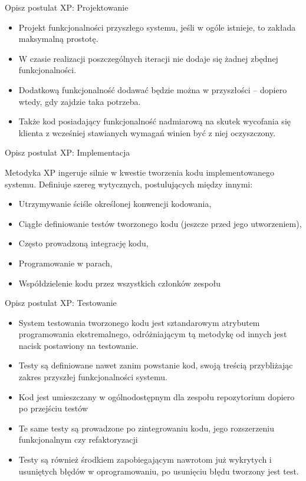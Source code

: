 \documentclass[a4paper,15pt]{article}
\begin{document}
\begin{framed}
Opisz postulat XP: Projektowanie
\end{framed}
\begin{itemize}
\item Projekt funkcjonalności przyszłego systemu, jeśli w ogóle istnieje, to zakłada maksymalną prostotę. 
\item W czasie realizacji poszczególnych iteracji nie dodaje się żadnej zbędnej funkcjonalności.
\item Dodatkową funkcjonalność dodawać będzie można w przyszłości – dopiero wtedy, gdy zajdzie taka potrzeba.
\item Także kod posiadający funkcjonalność nadmiarową na skutek wycofania się klienta z wcześniej stawianych wymagań winien być z niej oczyszczony.
\end{itemize}


\begin{framed}
Opisz postulat XP: Implementacja
\end{framed}
Metodyka XP ingeruje silnie w kwestie tworzenia kodu implementowanego systemu. Definiuje szereg wytycznych, postulujących między innymi:
\begin{itemize}
\item Utrzymywanie ściśle określonej konwencji kodowania, 
\item Ciągłe definiowanie testów tworzonego kodu (jeszcze przed jego utworzeniem),
\item Często prowadzoną integrację kodu,
\item Programowanie w parach, 
\item Współdzielenie kodu przez wszystkich członków zespołu
\end{itemize}


\begin{framed}
Opisz postulat XP: Testowanie
\end{framed}
\begin{itemize}
\item System  testowania  tworzonego  kodu  jest  sztandarowym atrybutem  programowania  ekstremalnego,  odróżniającym  tą metodykę od innych jest nacisk postawiony na testowanie. 
\item Testy są definiowane nawet zanim powstanie kod, swoją treścią przybliżając zakres przyszłej funkcjonalności systemu. 
\item Kod  jest  umieszczany  w  ogólnodostępnym  dla  zespołu repozytorium dopiero po przejściu testów
\item Te  same  testy  są  prowadzone  po  zintegrowaniu  kodu,  jego rozszerzeniu funkcjonalnym czy refaktoryzacji
\item Testy  są  również  środkiem  zapobiegającym  nawrotom  już wykrytych i usuniętych błędów w oprogramowaniu, po usunięciu błędu tworzony jest test.
\end{itemize}
\end{document}
